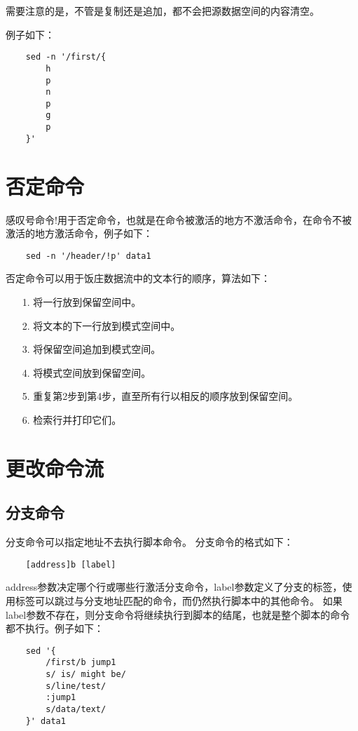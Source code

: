 \documentclass[a4paper,left=2.5cm,right=2.5cm,11pt]{article}
\begin{document}
	需要注意的是，不管是复制还是追加，都不会把源数据空间的内容清空。\par

	例子如下：
	\begin{lstlisting}
	sed -n '/first/{
		h
		p
		n
		p
		g
		p
	}'
	\end{lstlisting}

\section{否定命令}
	感叹号命令!用于否定命令，也就是在命令被激活的地方不激活命令，在命令不被激活的地方激活命令，例子如下：
	\begin{lstlisting}
	sed -n '/header/!p' data1
	\end{lstlisting}

	否定命令可以用于饭庄数据流中的文本行的顺序，算法如下：
	\begin{itemize}
		\item[1.] 将一行放到保留空间中。
		\item[2.] 将文本的下一行放到模式空间中。
		\item[3.] 将保留空间追加到模式空间。
		\item[4.] 将模式空间放到保留空间。
		\item[5.] 重复第2步到第4步，直至所有行以相反的顺序放到保留空间。
		\item[6.] 检索行并打印它们。
	\end{itemize}

\section{更改命令流}
\subsection{分支命令}
	分支命令可以指定地址不去执行脚本命令。
	分支命令的格式如下：
	\begin{lstlisting}
	[address]b [label]
	\end{lstlisting}

	address参数决定哪个行或哪些行激活分支命令，label参数定义了分支的标签，使用标签可以跳过与分支地址匹配的命令，而仍然执行脚本中的其他命令。
	如果label参数不存在，则分支命令将继续执行到脚本的结尾，也就是整个脚本的命令都不执行。例子如下：
	\begin{lstlisting}
	sed '{
		/first/b jump1
		s/ is/ might be/
		s/line/test/
		:jump1
		s/data/text/
	}' data1
	\end{lstlisting}
	
\end{document}
